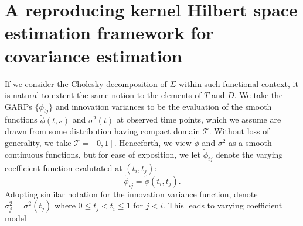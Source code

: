 

\chapter{A reproducing kernel Hilbert space estimation framework for covariance estimation} \label{SSANOVA-chapter}
%
%
%
%


If we consider the Cholesky decomposition of $\Sigma$ within such functional context, it is natural to extent the same notion to the elements of $T$ and $D$. We take the GARPs $\lbrace \phi_{tj} \rbrace$ and innovation variances to be the evaluation of the smooth functions $\tilde{\phi}\left(t,s\right)$ and $\sigma^2\left(t\right)$ at observed time points, which we assume  are drawn from some distribution having compact domain $\mathcal{T}$. Without loss of generality, we take $\mathcal{T} = \left[0,1\right]$. Henceforth, we view $\tilde{\phi}$ and $\sigma^2$ as a smooth continuous functions, but for ease of exposition, we let $\tilde{\phi}_{ij}$ denote the varying coefficient function evalutated at $\left(t_i,t_j\right)$: 
\[
\tilde{\phi}_{tj} = \tilde{\phi}\left(t_{i},t_{j}\right). 
\]
Adopting similar notation for the innovation variance function, denote $\sigma_{j}^2 = \sigma^2\left(t_{j}\right)$ where $0 \le t_{j} < t_{i} \le 1$ for $j < i$. This leads to varying coefficient model

